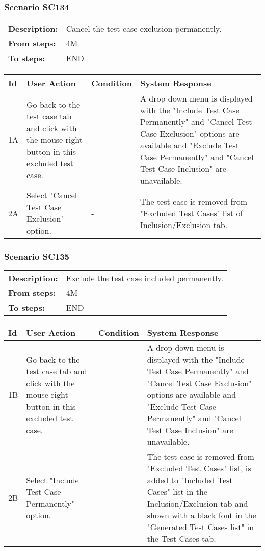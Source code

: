 \documentclass[a4paper,11pt]{article}
\newcommand{\bl}{\\ \hline}
\begin{document}
\subsubsection*{Scenario SC134}
\begin{tabular}{p{1in}p{4in}}
{\bf Description:} & Cancel the test case exclusion permanently.
				 \\
{\bf From steps:} & 4M \\
{\bf To steps:} & END \\
\end{tabular}
 
\begin{tabular}{|p{0.8in}|p{1.6in}|p{1.6in}|p{1.6in}|}
\hline
Id & User Action & Condition & System Response  \bl 
1A & Go back to the test case tab and click with the mouse right
						button in this excluded test case. & - & A drop down menu is displayed with the "Include Test Case
						Permanently" and "Cancel Test Case Exclusion" options are
						available and "Exclude Test Case Permanently" and "Cancel Test
						Case Inclusion" are unavailable. \bl 
2A & Select "Cancel Test Case Exclusion" option. & - & The test case is removed from "Excluded Test Cases" list
						of Inclusion/Exclusion tab. \bl 
\end{tabular}
\subsubsection*{Scenario SC135}
\begin{tabular}{p{1in}p{4in}}
{\bf Description:} & Exclude the test case included permanently.
				 \\
{\bf From steps:} & 4M \\
{\bf To steps:} & END \\
\end{tabular}
 
\begin{tabular}{|p{0.8in}|p{1.6in}|p{1.6in}|p{1.6in}|}
\hline
Id & User Action & Condition & System Response  \bl 
1B & Go back to the test case tab and click with the mouse right
						button in this excluded test case. & - & A drop down menu is displayed with the "Include Test Case
						Permanently" and "Cancel Test Case Exclusion" options are
						available and "Exclude Test Case Permanently" and "Cancel Test
						Case Inclusion" are unavailable. \bl 
2B & Select "Include Test Case Permanently" option. & - & The test case is removed from "Excluded Test Cases" list,
						is added to "Included Test Cases" list in the Inclusion/Exclusion
						tab and shown with a black font in the "Generated Test Cases list"
						in the Test Cases tab. \bl 
\end{tabular}
\end{document}

